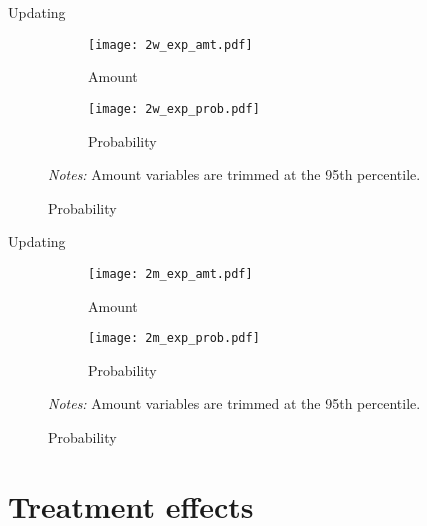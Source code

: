 \documentclass[8pt]{beamer}
\begin{document}
\begin{frame}{Updating}
        \begin{figure}[H]
    \caption{Updating at 2 weeks}
    \label{update_exp2w}
    \begin{center}
        \begin{subfigure}{0.45\textwidth}
            \caption{Amount}
            \centering
            \texttt{[image: 2w\_exp\_amt.pdf]}
        \end{subfigure}
        \begin{subfigure}{0.45\textwidth}
            \caption{Probability}
            \centering
            \texttt{[image: 2w\_exp\_prob.pdf]}
        \end{subfigure}
      \end{center} 
         \scriptsize \textit{Notes:} Amount variables are trimmed at the 95th percentile.
\end{figure}      
        
\end{frame}


\begin{frame}{Updating}
    \begin{figure}[H]
    \caption{Updating at 2 months}
    \label{update_exp2m}
    \begin{center}
            \begin{subfigure}{0.45\textwidth}
            \caption{Amount}
            \centering
            \texttt{[image: 2m\_exp\_amt.pdf]}
        \end{subfigure}
        \begin{subfigure}{0.45\textwidth}
            \caption{Probability}
            \centering
            \texttt{[image: 2m\_exp\_prob.pdf]}
        \end{subfigure}
    \end{center} 
         \scriptsize \textit{Notes:} Amount variables are trimmed at the 95th percentile.
\end{figure}

\end{frame}




\section{Treatment effects}
\end{document}
